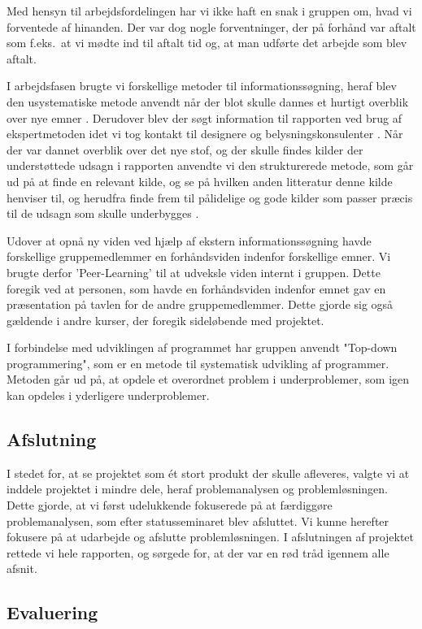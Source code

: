 \documentclass[oneside,a4paper,titlepage]{article}
\begin{document}
Med hensyn til arbejdsfordelingen har vi ikke haft en snak i gruppen om, hvad vi forventede af hinanden. Der var dog nogle forventninger, der på forhånd var aftalt som f.eks.\ at vi mødte ind til aftalt tid og, at man udførte det arbejde som blev aftalt. 

I arbejdsfasen brugte vi forskellige metoder til informationssøgning, heraf blev den usystematiske metode anvendt når der blot skulle dannes et hurtigt overblik over nye emner \cite{SO_bog}. Derudover blev der søgt information til rapporten ved brug af ekspertmetoden idet vi tog kontakt til designere og belysningskonsulenter \cite{SO_bog}. Når der var dannet overblik over det nye stof, og der skulle findes kilder der understøttede udsagn i rapporten anvendte vi den strukturerede metode, som går ud på at finde en relevant kilde, og se på hvilken anden litteratur denne kilde henviser til, og herudfra finde frem til pålidelige og gode kilder som passer præcis til de udsagn som skulle underbygges \cite{SO_bog}. 

Udover at opnå ny viden ved hjælp af ekstern informationssøgning havde forskellige gruppemedlemmer en forhåndsviden indenfor forskellige emner. Vi brugte derfor 'Peer-Learning' til at udveksle viden internt i gruppen. Dette foregik ved at personen, som havde en forhåndsviden indenfor emnet gav en præsentation på tavlen for de andre gruppemedlemmer. Dette gjorde sig også gældende i andre kurser, der foregik sideløbende med projektet.

I forbindelse med udviklingen af programmet har gruppen anvendt "Top-down programmering", som er en metode til systematisk udvikling af programmer. Metoden går ud på, at opdele et overordnet problem i underproblemer, som igen kan opdeles i yderligere underproblemer.

\subsection{Afslutning}

I stedet for, at se projektet som ét stort produkt der skulle afleveres, valgte vi at inddele projektet i mindre dele, heraf problemanalysen og problemløsningen. Dette gjorde, at vi først udelukkende fokuserede på at færdiggøre problemanalysen, som efter statusseminaret blev afsluttet. Vi kunne herefter fokusere på at udarbejde og afslutte problemløsningen. 
I afslutningen af projektet rettede vi hele rapporten, og sørgede for, at der var en rød tråd igennem alle afsnit.

\subsection{Evaluering}
\end{document}
